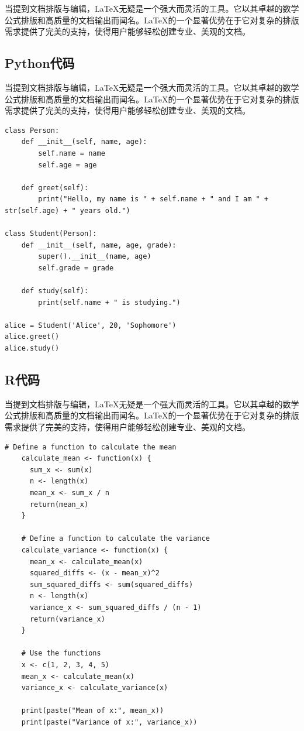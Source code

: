 \documentclass[AutoFakeBold,a4paper]{ctexart}
\begin{document}
当提到文档排版与编辑，LaTeX无疑是一个强大而灵活的工具。它以其卓越的数学公式排版和高质量的文档输出而闻名。LaTeX的一个显著优势在于它对复杂的排版需求提供了完美的支持，使得用户能够轻松创建专业、美观的文档。

\subsection{Python代码}


当提到文档排版与编辑，LaTeX无疑是一个强大而灵活的工具。它以其卓越的数学公式排版和高质量的文档输出而闻名。LaTeX的一个显著优势在于它对复杂的排版需求提供了完美的支持，使得用户能够轻松创建专业、美观的文档。


\begin{lstlisting}[style=Python]
    class Person:
    def __init__(self, name, age):
        self.name = name
        self.age = age

    def greet(self):
        print("Hello, my name is " + self.name + " and I am " + str(self.age) + " years old.")

class Student(Person):
    def __init__(self, name, age, grade):
        super().__init__(name, age)
        self.grade = grade

    def study(self):
        print(self.name + " is studying.")

alice = Student('Alice', 20, 'Sophomore')
alice.greet()
alice.study()

\end{lstlisting}

\subsection{R代码}


当提到文档排版与编辑，LaTeX无疑是一个强大而灵活的工具。它以其卓越的数学公式排版和高质量的文档输出而闻名。LaTeX的一个显著优势在于它对复杂的排版需求提供了完美的支持，使得用户能够轻松创建专业、美观的文档。

\begin{lstlisting}[style=R]
    # Define a function to calculate the mean
    calculate_mean <- function(x) {
      sum_x <- sum(x)
      n <- length(x)
      mean_x <- sum_x / n
      return(mean_x)
    }
    
    # Define a function to calculate the variance
    calculate_variance <- function(x) {
      mean_x <- calculate_mean(x)
      squared_diffs <- (x - mean_x)^2
      sum_squared_diffs <- sum(squared_diffs)
      n <- length(x)
      variance_x <- sum_squared_diffs / (n - 1)
      return(variance_x)
    }
    
    # Use the functions
    x <- c(1, 2, 3, 4, 5)
    mean_x <- calculate_mean(x)
    variance_x <- calculate_variance(x)
    
    print(paste("Mean of x:", mean_x))
    print(paste("Variance of x:", variance_x))
\end{lstlisting}


\newpage




\end{document}
